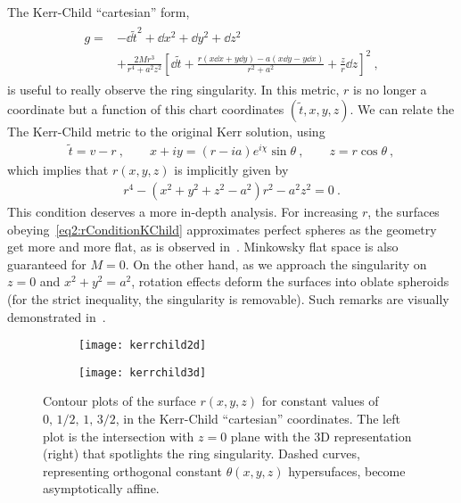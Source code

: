 The Kerr-Child ``cartesian'' form, 
\begin{align}
    \begin{split}
        g = &- \dd \tilde{t}^2 + \dd x^2 + \dd y^2 + \dd z^2 \\
        &+ \frac{2 M r^3}{r^4 + a^2 z^2} \left[ \dd \tilde{t} + \frac{r (x \dd x + y \dd y) - a (x \dd y - y \dd x)}{r^2+a^2} + \frac{z}{r} \dd z \right]^2 ~,
    \end{split}
    \label{eq2:KerrChild}
\end{align}
is useful to really observe the ring singularity.
In this metric, $r$ is no longer a coordinate but a function of this chart coordinates $(\tilde{t},x,y,z)$.
We can relate the The Kerr-Child metric to the original Kerr solution, using
\begin{align}
    \tilde{t} = v - r ~, \qquad x+ i y = (r -i a) e^{i \chi} \sin\theta ~,\qquad z=r\cos\theta ~,
    \label{eq2:InEFtoKChild}
\end{align}
which implies that $r(x,y,z)$ is implicitly given by
\begin{align}
    r^4 - (x^2+y^2+z^2-a^2)r^2 -a^2 z^2 = 0 ~.
    \label{eq2:rConditionKChild}
\end{align}
This condition deserves a more in-depth analysis.
For increasing $r$, the surfaces obeying~\eqref{eq2:rConditionKChild} approximates perfect spheres as the geometry get more and more flat, as is observed in~. Minkowsky flat space is also guaranteed for $M=0$.
On the other hand, as we approach the singularity on $z=0$ and $x^2+y^2 = a^2$, rotation effects deform the surfaces into oblate spheroids (for the strict inequality, the singularity is removable).
Such remarks are visually demonstrated in~.

\begin{figure}[h]
    \centering
    \begin{subfigure}[c]{0.45\textwidth}
        \texttt{[image: kerrchild2d]}
    \end{subfigure}
    \hspace{1cm}
    \begin{subfigure}[c]{0.35\textwidth}
        \texttt{[image: kerrchild3d]}
    \end{subfigure}
    \caption{Contour plots of the surface $r(x,y,z)$ for constant values of $0,\,1/2,\,1,\,3/2$, in the Kerr-Child ``cartesian'' coordinates. The left plot is the intersection with $z=0$ plane with the 3D representation (right) that spotlights the ring singularity. Dashed curves, representing orthogonal constant $\theta(x,y,z)$ hypersufaces, become asymptotically affine.}\label{fig2:kerrchild}
\end{figure}

